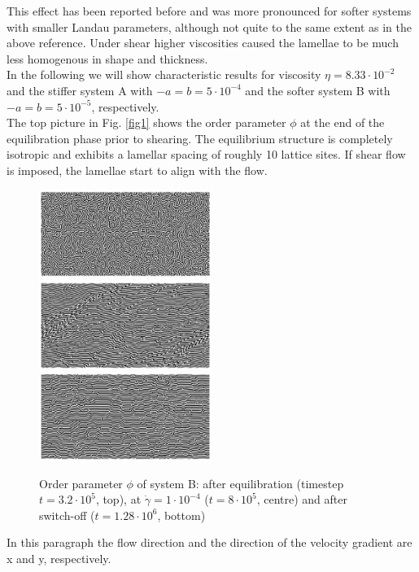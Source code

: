 \documentclass[8.5pt,twoside,twocolumn]{article}
\newcommand{\e}[1]{\cdot10^{#1}}
\begin{document}
This effect has been reported before \cite{Gonnella97} and was more pronounced for softer systems with smaller Landau parameters, although not quite to the same extent as in the above reference.
Under shear higher viscosities caused the lamellae to be much less homogenous in shape and thickness.\\
In the following we will show characteristic results for viscosity $\eta=8.33\e{-2}$ and the stiffer system A with $-a=b=5\e{-4}$ and the softer system B with $-a=b=5\e{-5}$, respectively.\\
The top picture in Fig. \ref{fig1} shows the order parameter $\phi$ at the end of the equilibration phase prior to shearing.
The equilibrium structure is completely isotropic and exhibits a lamellar spacing of roughly 10 lattice sites.
If shear flow is imposed, the lamellae start to align with the flow.
\begin{figure}[!]
\centering
\includegraphics[angle=0,width=0.5\textwidth]{phi_run707_320.jpg}\\
\includegraphics[angle=0,width=0.5\textwidth]{phi_run710_800.jpg}\\
\includegraphics[angle=0,width=0.5\textwidth]{phi_run765_1280.jpg}
\caption{Order parameter $\phi$ of system B: after equilibration (timestep $t=3.2\e{5}$, top), at $\dot{\gamma}=1\cdot10^{-4}$ ($t=8\e{5}$, centre) and after switch-off ($t=1.28\e{6}$, bottom)}
\label{fig2}
\end{figure}
In this paragraph the flow direction and the direction of the velocity gradient are x and y, respectively.
\end{document}

